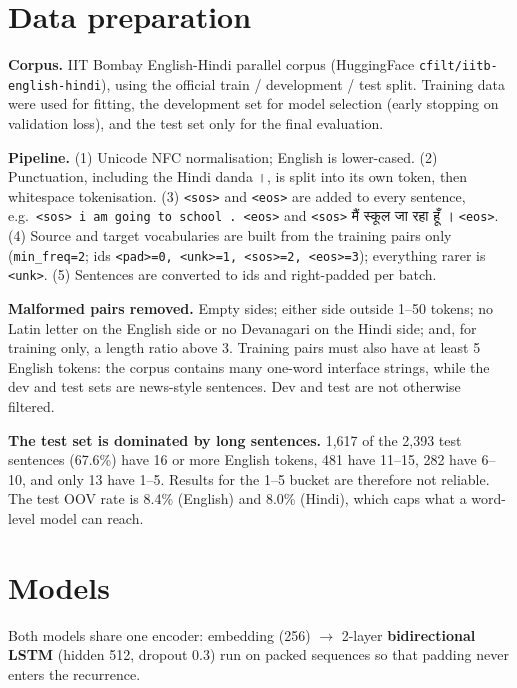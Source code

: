 \documentclass[10pt,a4paper]{article}
\DeclareRobustCommand{\hi}[1]{{\hindifont #1}}
\newcommand{\code}[1]{\texttt{#1}}
\newcommand{\sos}{\texttt{<sos>}}
\newcommand{\eos}{\texttt{<eos>}}
\newcommand{\unk}{\texttt{<unk>}}
\begin{document}
\section{Data preparation}
\textbf{Corpus.} IIT Bombay English-Hindi parallel corpus (HuggingFace \code{cfilt/iitb-english-hindi}), using the official
train / development / test split. Training data were used for fitting, the development set for model selection (early stopping on
validation loss), and the test set only for the final evaluation.

\begin{table}[H]\centering\tabData\caption{Data statistics (from \code{outputs/results/attention\_seed42/data\_stats.json}).}\end{table}

\textbf{Pipeline.} (1) Unicode NFC normalisation; English is lower-cased. (2) Punctuation, including the Hindi danda
\hi{।}, is split into its own token, then whitespace tokenisation. (3) \sos{} and \eos{} are added to every sentence, e.g.\
\texttt{<sos> i am going to school . <eos>} and \texttt{<sos>} \hi{मैं स्कूल जा रहा हूँ ।} \texttt{<eos>}. (4) Source and target vocabularies are
built from the training pairs only (\code{min\_freq=2}; ids \code{<pad>=0, <unk>=1, <sos>=2, <eos>=3}); everything rarer is \unk{}.
(5) Sentences are converted to ids and right-padded per batch.

\textbf{Malformed pairs removed.} Empty sides; either side outside 1--50 tokens; no Latin letter on the English side or no Devanagari
on the Hindi side; and, for training only, a length ratio above 3. Training pairs must also have at least 5 English tokens: the corpus
contains many one-word interface strings, while the dev and test sets are news-style sentences. Dev and test are not otherwise filtered.

\textbf{The test set is dominated by long sentences.} 1,617 of the 2,393 test sentences (67.6\%) have 16 or more English tokens, 481 have
11--15, 282 have 6--10, and only 13 have 1--5. Results for the 1--5 bucket are therefore not reliable. The test OOV rate is 8.4\% (English)
and 8.0\% (Hindi), which caps what a word-level model can reach.

\section{Models}
Both models share one encoder: embedding (256) $\rightarrow$ 2-layer \textbf{bidirectional LSTM} (hidden 512, dropout 0.3) run on packed
sequences so that padding never enters the recurrence.
\end{document}
